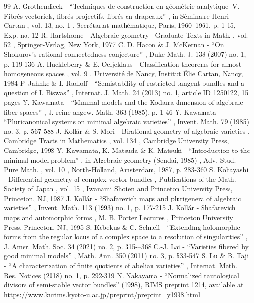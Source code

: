 \documentclass[11pt]{article}
\theoremstyle{plain}
\theoremstyle{definition}
\numberwithin{equation}{thm}
\numberwithin{enumi}{thm}
\begin{document}
\begin{thebibliography}{99}
 A. Grothendieck - “Techniques de construction en géométrie analytique. V. Fibrés vectoriels, fibrés projectifs, fibrés en drapeaux” , in Séminaire Henri Cartan , vol. 13, no. 1 , Secrétariat mathématique, Paris, 1960–1961, p. 1-15, Exp. no. 12
 R. Hartshorne - Algebraic geometry , Graduate Texts in Math. , vol. 52 , Springer-Verlag, New York, 1977
 C. D. Hacon \& J. McKernan - “On Shokurov’s rational connectedness conjecture” , Duke Math. J. 138 (2007) no. 1, p. 119-136
 A. Huckleberry \& E. Oeljeklaus - Classification theorems for almost homogeneous spaces , vol. 9 , Université de Nancy, Institut Élie Cartan, Nancy, 1984
 P. Jahnke \& I. Radloff - “Semistability of restricted tangent bundles and a question of I. Biswas” , Internat. J. Math. 24 (2013) no. 1, article ID 1250122, 15 pages
 Y. Kawamata - “Minimal models and the Kodaira dimension of algebraic fiber spaces” , J. reine angew. Math. 363 (1985), p. 1-46
 Y. Kawamata - “Pluricanonical systems on minimal algebraic varieties” , Invent. Math. 79 (1985) no. 3, p. 567-588
 J. Kollár \& S. Mori - Birational geometry of algebraic varieties , Cambridge Tracts in Mathematics , vol. 134 , Cambridge University Press, Cambridge, 1998
 Y. Kawamata, K. Matsuda \& K. Matsuki - “Introduction to the minimal model problem” , in Algebraic geometry (Sendai, 1985) , Adv. Stud. Pure Math. , vol. 10 , North-Holland, Amsterdam, 1987, p. 283-360
 S. Kobayashi - Differential geometry of complex vector bundles , Publications of the Math. Society of Japan , vol. 15 , Iwanami Shoten and Princeton University Press, Princeton, NJ, 1987
 J. Kollár - “Shafarevich maps and plurigenera of algebraic varieties” , Invent. Math. 113 (1993) no. 1, p. 177-215
 J. Kollár - Shafarevich maps and automorphic forms , M. B. Porter Lectures , Princeton University Press, Princeton, NJ, 1995
 S. Kebekus \& C. Schnell - “Extending holomorphic forms from the regular locus of a complex space to a resolution of singularities” , J. Amer. Math. Soc. 34 (2021) no. 2, p. 315-–368
 C.-J. Lai - “Varieties fibered by good minimal models” , Math. Ann. 350 (2011) no. 3, p. 533-547
 S. Lu \& B. Taji - “A characterization of finite quotients of abelian varieties” , Internat. Math. Res. Notices (2018) no. 1, p. 292-319
 N. Nakayama - “Normalized tautological divisors of semi-stable vector bundles” (1998), RIMS preprint 1214, available at https://www.kurims.kyoto-u.ac.jp/preprint/preprint\_y1998.html

\end{thebibliography}
\end{document}
